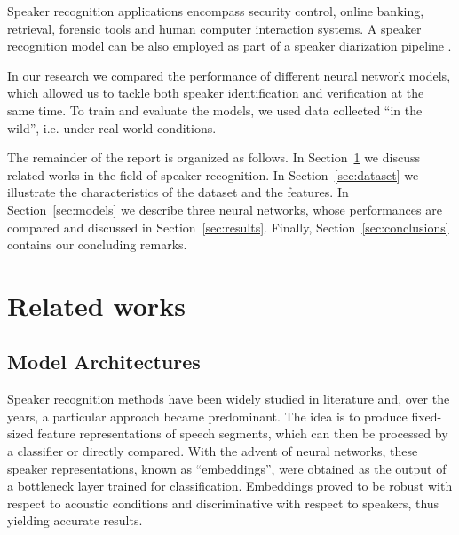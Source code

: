 \documentclass[conference]{IEEEtran}
\begin{document}
Speaker recognition applications encompass security control, online banking, retrieval, forensic tools and human computer interaction systems. A speaker recognition model can be also employed as part of a speaker diarization pipeline \cite{chung2018voxceleb2}.

In our research we compared the performance of different neural network models, which allowed us to tackle both speaker identification and verification at the same time. To train and evaluate the models, we used data collected ``in the wild'', i.e. under real-world conditions.


The remainder of the report is organized as follows. In Section~\ref{sec:related_works} we discuss related works in the field of speaker recognition. In Section~\ref{sec:dataset} we illustrate the characteristics of the dataset and the features. In Section~\ref{sec:models} we describe three neural networks, whose performances are compared and discussed in Section~\ref{sec:results}. Finally, Section~\ref{sec:conclusions} contains our concluding remarks.  


\section{Related works}
\label{sec:related_works}

\subsection{Model Architectures}


Speaker recognition methods have been widely studied in literature and, over the years, a particular approach became predominant. The idea is to produce fixed-sized feature representations of speech segments, which can then be processed by a classifier or directly compared. With the advent of neural networks, these speaker representations, known as ``embeddings'', were obtained as the output of a bottleneck layer trained for classification. Embeddings proved to be robust with respect to acoustic conditions and discriminative with respect to speakers, thus yielding accurate results. 
\end{document}
